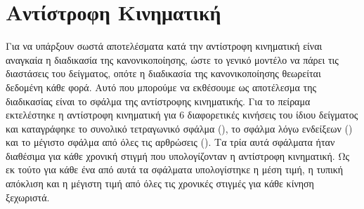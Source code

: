 \section{Αντίστροφη Κινηματική}

Για να υπάρξουν σωστά αποτελέσματα κατά την αντίστροφη κινηματική είναι αναγκαία η διαδικασία της κανονικοποίησης, ώστε το γενικό μοντέλο να πάρει τις διαστάσεις του δείγματος, οπότε η διαδικασία της κανονικοποίησης θεωρείται δεδομένη κάθε φορά. Αυτό που μπορούμε να εκθέσουμε ως αποτέλεσμα της διαδικασίας είναι το σφάλμα της αντίστροφης κινηματικής. Για το πείραμα εκτελέστηκε η αντίστροφη κινηματική για 6 διαφορετικές κινήσεις του ίδιου δείγματος και καταγράφηκε το συνολικό τετραγωνικό σφάλμα (), το σφάλμα λόγω ενδείξεων () και το μέγιστο σφάλμα από όλες τις αρθρώσεις (). Τα τρία αυτά σφάλματα ήταν διαθέσιμα για κάθε χρονική στιγμή που υπολογίζονταν η αντίστροφη κινηματική. Ως εκ τούτο για κάθε ένα από αυτά τα σφάλματα υπολογίστηκε η μέση τιμή, η τυπική απόκλιση και η μέγιστη τιμή από όλες τις χρονικές στιγμές για κάθε κίνηση ξεχωριστά.


